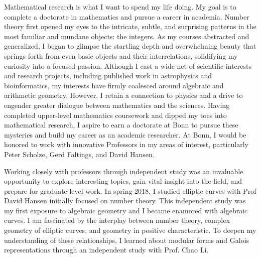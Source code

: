 \documentclass[11pt]{article}
\begin{document}
Mathematical research is what I want to spend my life doing. My goal is to complete a doctorate in mathematics and pursue a career in academia. Number theory first opened my eyes to the intricate, subtle, and surprising patterns in the most familiar and mundane objects: the integers. As my courses abstracted and generalized, I began to glimpse the startling depth and overwhelming beauty that springs forth from even basic objects and their interrelations, solidifying my curiosity into a focused passion. Although I cast a wide net of scientific interests and research projects, including published work in astrophysics and bioinformatics, my interests have firmly coalesced around algebraic and arithmetic geometry. However, I retain a connection to physics and a drive to engender greater dialogue between mathematics and the sciences. Having completed upper-level mathematics coursework and dipped my toes into mathematical research, I aspire to earn a doctorate at Bonn to pursue these mysteries and build my career as an academic researcher. At Bonn, I would be honored to work with innovative Professors in my areas of interest, particularly Peter Scholze, Gerd Faltings, and David Hansen. 
\par
Working closely with professors through independent study was an invaluable opportunity to explore interesting topics, gain vital insight into the field, and prepare for graduate-level work. In spring 2018, I studied elliptic curves with Prof David Hansen initially focused on number theory. This independent study was my first exposure to algebraic geometry and I became enamored with algebraic curves. I am fascinated by the interplay between number theory, complex geometry of elliptic curves, and geometry in positive characteristic. To deepen my understanding of these relationships, I learned about modular forms and Galois representations through an independent study with Prof. Chao Li. 
\par
\end{document}
